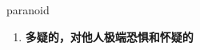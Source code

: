 
\begin{frame}
{\huge paranoid}
\begin{center}
\begin{enumerate}\Large
  \item \textbf{多疑的，对他人极端恐惧和怀疑的}
\end{enumerate}
\end{center}
\end{frame}
